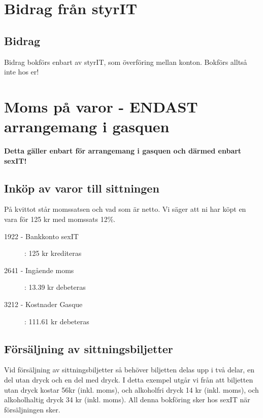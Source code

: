 \documentclass{article}
\begin{document}
\section{Bidrag från styrIT}
\subsection{Bidrag}
Bidrag bokförs enbart av styrIT, som överföring mellan konton. Bokförs alltså inte hos er! 

\section{Moms på varor - ENDAST arrangemang i gasquen}
\textbf{Detta gäller enbart för arrangemang i gasquen och därmed enbart sexIT!}
\subsection{Inköp av varor till sittningen}
På kvittot står momssatsen och vad som är netto. Vi säger att ni har köpt en vara för 125 kr med momssats 12\%. 
\begin{description}
    \item [1922 - Bankkonto sexIT ]: 125 kr krediteras
    \item [2641 - Ingående moms]: 13.39 kr debeteras
    \item [3212 - Kostnader Gasque]: 111.61 kr debeteras
\end{description}

\subsection{Försäljning av sittningsbiljetter}
Vid försäljning av sittningsbiljetter så behöver biljetten delas upp i två delar, en del utan dryck och en del med dryck. I detta exempel utgår vi från att biljetten utan dryck kostar 56kr (inkl. moms), och alkoholfri dryck 14 kr (inkl. moms), och alkoholhaltig dryck 34 kr (inkl. moms). All denna bokföring sker hos sexIT när försäljningen sker.
\end{document}
